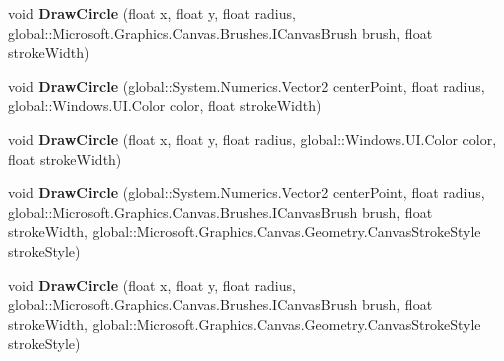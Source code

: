 \begin{DoxyCompactItemize}
\item 
\mbox{\label{interface_microsoft_1_1_graphics_1_1_canvas_1_1_i_canvas_drawing_session_ae8d54b0512ca1a4b91f8830aed1bc33c}} 
void {\bfseries Draw\+Circle} (float x, float y, float radius, global\+::\+Microsoft.\+Graphics.\+Canvas.\+Brushes.\+I\+Canvas\+Brush brush, float stroke\+Width)
\item 
\mbox{\label{interface_microsoft_1_1_graphics_1_1_canvas_1_1_i_canvas_drawing_session_a1b3203ea3b7765772ef9037c131e2b6d}} 
void {\bfseries Draw\+Circle} (global\+::\+System.\+Numerics.\+Vector2 center\+Point, float radius, global\+::\+Windows.\+U\+I.\+Color color, float stroke\+Width)
\item 
\mbox{\label{interface_microsoft_1_1_graphics_1_1_canvas_1_1_i_canvas_drawing_session_a34d82da4cfcb24e255b6320b7a2d999b}} 
void {\bfseries Draw\+Circle} (float x, float y, float radius, global\+::\+Windows.\+U\+I.\+Color color, float stroke\+Width)
\item 
\mbox{\label{interface_microsoft_1_1_graphics_1_1_canvas_1_1_i_canvas_drawing_session_a0a8248f4a2fd8895425d254f73ca7350}} 
void {\bfseries Draw\+Circle} (global\+::\+System.\+Numerics.\+Vector2 center\+Point, float radius, global\+::\+Microsoft.\+Graphics.\+Canvas.\+Brushes.\+I\+Canvas\+Brush brush, float stroke\+Width, global\+::\+Microsoft.\+Graphics.\+Canvas.\+Geometry.\+Canvas\+Stroke\+Style stroke\+Style)
\item 
\mbox{\label{interface_microsoft_1_1_graphics_1_1_canvas_1_1_i_canvas_drawing_session_a817ea9d1d097ed18a62e9ef040bba1dc}} 
void {\bfseries Draw\+Circle} (float x, float y, float radius, global\+::\+Microsoft.\+Graphics.\+Canvas.\+Brushes.\+I\+Canvas\+Brush brush, float stroke\+Width, global\+::\+Microsoft.\+Graphics.\+Canvas.\+Geometry.\+Canvas\+Stroke\+Style stroke\+Style)
\item 
\mbox{\label{interface_microsoft_1_1_graphics_1_1_canvas_1_1_i_canvas_drawing_session_a77be01d141f925bb393cbb8229f35498}} 

\end{DoxyCompactItemize}
